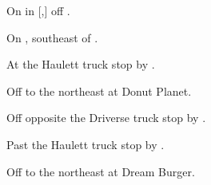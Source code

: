 
\begin{LocationList}

On  in [,] off  .

On , southeast of  .

At the Haulett truck stop by  .

Off   to the northeast at Donut Planet.

Off  opposite the Driverse truck stop by  .

Past the Haulett truck stop by  .

Off   to the northeast at Dream Burger.

\end{LocationList}
